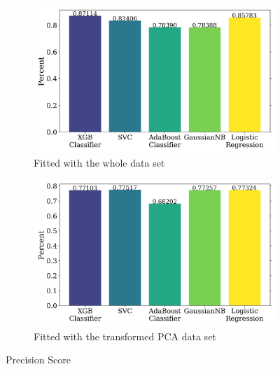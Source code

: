 \documentclass{article}
\begin{document}
\begin{figure}[H]
    \centering
    \begin{subfigure}[t]{0.495\textwidth}
        \centering
        \includegraphics[width=\textwidth]{supporting_images/precision_notpca.png}
        \caption{Fitted with the whole data set}
        \label{fig:precision_notpca}
    \end{subfigure}
    \hfill
    \begin{subfigure}[t]{0.495\textwidth}
        \centering
        \includegraphics[width=\textwidth]{supporting_images/precision_pca.png}
        \caption{Fitted with the transformed PCA data set}
        \label{fig:precision_pca}
    \end{subfigure}
    \caption{Precision Score}
    \label{fig:precision}
\end{figure}
\end{document}
